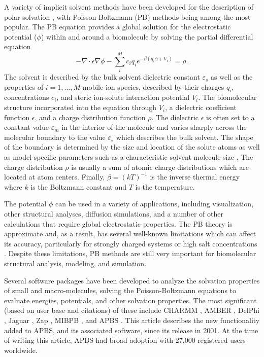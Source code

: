 \documentclass[11pt,titlepage]{article}
\begin{document}
A variety of implicit solvent methods have been developed for the description of polar solvation \cite{Ren2012}, with Poisson-Boltzmann (PB) methods being among the most popular.
The PB equation \cite{Fixman1979, Grochowski2008, Lamm2003} provides a global solution for the electrostatic potential ($\phi$) within and around a biomolecule by solving the partial differential equation
\begin{equation}
	-\nabla \cdot \epsilon \nabla \phi - \sum_i^M c_i q_i e^{-\beta \left(q_i \phi + V_i \right)} = \rho.
\end{equation}
The solvent is described by the bulk solvent dielectric constant $\varepsilon_s$ as well as the properties of $i=1,\ldots,M$ mobile ion species, described by their charges $q_i$, concentrations $c_i$, and steric ion-solute interaction potential $V_i$.
The biomolecular structure incorporated into the equation through $V_i$, a dielectric coefficient function $\epsilon$, and a charge distribution function $\rho$.
The dielectric $\epsilon$ is often set to a constant value $\varepsilon_m$ in the interior of the molecule and varies sharply across the molecular boundary to the value $\varepsilon_s$ which describes the bulk solvent.
The shape of the boundary is determined by the size and location of the solute atoms as well as model-specific parameters such as a characteristic solvent molecule size \cite{LeeRichards}.
The charge distribution $\rho$ is usually a sum of atomic charge distributions which are located at atom centers.
Finally, $\beta = \left( kT \right)^{-1}$ is the inverse thermal energy where $k$ is the Boltzmann constant and $T$ is the temperature.

The potential $\phi$ can be used in a variety of applications, including visualization, other structural analyses, diffusion simulations, and a number of other calculations that require global electrostatic properties.
The PB theory is approximate and, as a result, has several well-known limitations which can affect its accuracy, particularly for strongly charged systems or high salt concentrations \cite{Fixman1979, Netz2000}.
Despite these limitations, PB methods are still very important for biomolecular structural analysis, modeling, and simulation.

Several software packages have been developed to analyze the solvation properties of small and macro-molecules, solving the Poisson-Boltzmann equations to evaluate energies, potentials, and other solvation properties.
The most significant (based on user base and citations) of these include CHARMM \cite{Brooks2009}, AMBER \cite{Case2005}, DelPhi \cite{Sarkar2013}, Jaguar \cite{Bochevarov2013}, Zap \cite{Grant2001}, MIBPB \cite{Chen2011}, and APBS \cite{APBS}.
This article describes the new functionality added to APBS, and its associated software, since its release in 2001.
At the time of writing this article, APBS had broad adoption with 27,000 registered users worldwide.
\end{document}
